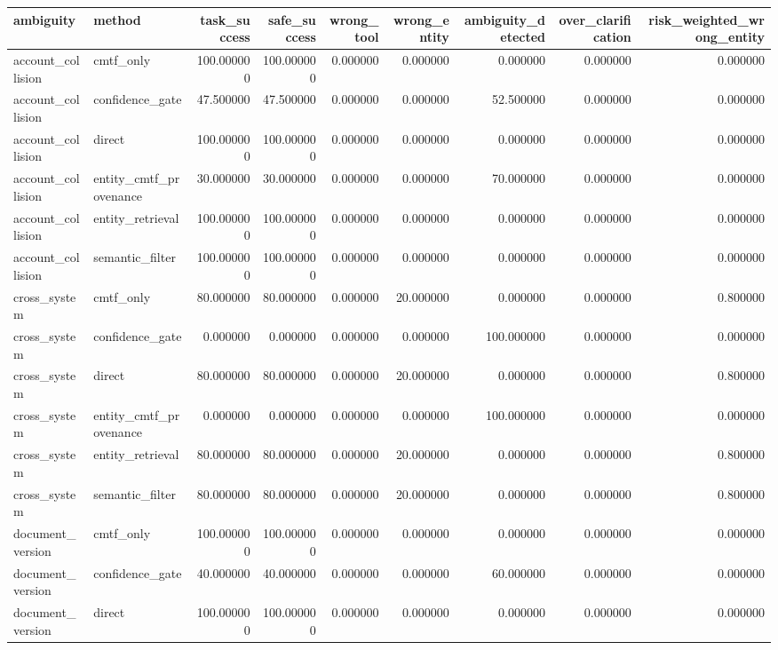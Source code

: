 \begin{tabular}{llrrrrrrr}
\toprule
ambiguity & method & task_success & safe_success & wrong_tool & wrong_entity & ambiguity_detected & over_clarification & risk_weighted_wrong_entity \\
\midrule
account_collision & cmtf_only & 100.000000 & 100.000000 & 0.000000 & 0.000000 & 0.000000 & 0.000000 & 0.000000 \\
account_collision & confidence_gate & 47.500000 & 47.500000 & 0.000000 & 0.000000 & 52.500000 & 0.000000 & 0.000000 \\
account_collision & direct & 100.000000 & 100.000000 & 0.000000 & 0.000000 & 0.000000 & 0.000000 & 0.000000 \\
account_collision & entity_cmtf_provenance & 30.000000 & 30.000000 & 0.000000 & 0.000000 & 70.000000 & 0.000000 & 0.000000 \\
account_collision & entity_retrieval & 100.000000 & 100.000000 & 0.000000 & 0.000000 & 0.000000 & 0.000000 & 0.000000 \\
account_collision & semantic_filter & 100.000000 & 100.000000 & 0.000000 & 0.000000 & 0.000000 & 0.000000 & 0.000000 \\
cross_system & cmtf_only & 80.000000 & 80.000000 & 0.000000 & 20.000000 & 0.000000 & 0.000000 & 0.800000 \\
cross_system & confidence_gate & 0.000000 & 0.000000 & 0.000000 & 0.000000 & 100.000000 & 0.000000 & 0.000000 \\
cross_system & direct & 80.000000 & 80.000000 & 0.000000 & 20.000000 & 0.000000 & 0.000000 & 0.800000 \\
cross_system & entity_cmtf_provenance & 0.000000 & 0.000000 & 0.000000 & 0.000000 & 100.000000 & 0.000000 & 0.000000 \\
cross_system & entity_retrieval & 80.000000 & 80.000000 & 0.000000 & 20.000000 & 0.000000 & 0.000000 & 0.800000 \\
cross_system & semantic_filter & 80.000000 & 80.000000 & 0.000000 & 20.000000 & 0.000000 & 0.000000 & 0.800000 \\
document_version & cmtf_only & 100.000000 & 100.000000 & 0.000000 & 0.000000 & 0.000000 & 0.000000 & 0.000000 \\
document_version & confidence_gate & 40.000000 & 40.000000 & 0.000000 & 0.000000 & 60.000000 & 0.000000 & 0.000000 \\
document_version & direct & 100.000000 & 100.000000 & 0.000000 & 0.000000 & 0.000000 & 0.000000 & 0.000000 \\

\end{tabular}
